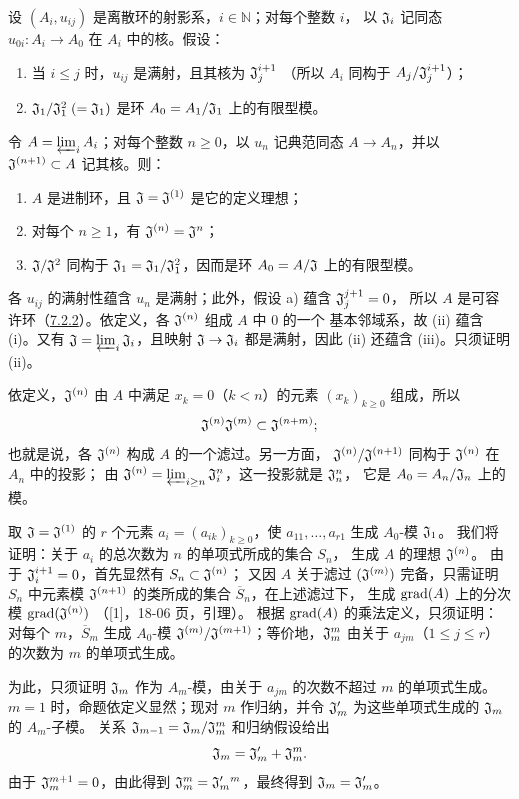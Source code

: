 设 $(A_i,u_{ij})$ 是离散环的射影系，$i\in\mathbb N$；对每个整数 $i$，
以 $\mathfrak J_i$ 记同态 $u_{0i}:A_i\to A_0$ 在 $A_i$ 中的核。假设：
\begin{enumerate}[label=\alph*)]
\item 当 $i\leq j$ 时，$u_{ij}$ 是满射，且其核为 $\mathfrak J_j^{i+1}$
（所以 $A_i$ 同构于 $A_j/\mathfrak J_j^{i+1}$）；
\item $\mathfrak J_1/\mathfrak J_1^2\;(=\mathfrak J_1)$ 是环 $A_0=A_1/\mathfrak J_1$ 上的有限型模。
\end{enumerate}
令 $A=\varprojlim_i A_i$；对每个整数 $n\geq0$，以 $u_n$ 记典范同态
$A\to A_n$，并以 $\mathfrak J^{(n+1)}\subset A$ 记其核。则：
\begin{enumerate}[label=(\roman*)]
\item $A$ 是进制环，且 $\mathfrak J=\mathfrak J^{(1)}$ 是它的定义理想；
\item 对每个 $n\geq1$，有 $\mathfrak J^{(n)}=\mathfrak J^n$；
\item $\mathfrak J/\mathfrak J^2$ 同构于 $\mathfrak J_1=\mathfrak J_1/\mathfrak J_1^2$，因而是环
$A_0=A/\mathfrak J$ 上的有限型模。
\end{enumerate}

各 $u_{ij}$ 的满射性蕴含 $u_n$ 是满射；此外，假设 a) 蕴含 $\mathfrak J_j^{j+1}=0$，
所以 $A$ 是可容许环（\hyperlink{para:0:7.2.2}{7.2.2}）。依定义，各 $\mathfrak J^{(n)}$ 组成 $A$ 中 $0$ 的一个
基本邻域系，故 (ii) 蕴含 (i)。又有 $\mathfrak J=\varprojlim_i\mathfrak J_i$，且映射
$\mathfrak J\to\mathfrak J_i$ 都是满射，因此 (ii) 还蕴含 (iii)。只须证明 (ii)。

依定义，$\mathfrak J^{(n)}$ 由 $A$ 中满足 $x_k=0$（$k<n$）的元素
$(x_k)_{k\geq0}$ 组成，所以
\[
 \mathfrak J^{(n)}\mathfrak J^{(m)}\subset\mathfrak J^{(n+m)};
\]
也就是说，各 $\mathfrak J^{(n)}$ 构成 $A$ 的一个滤过。另一方面，
$\mathfrak J^{(n)}/\mathfrak J^{(n+1)}$ 同构于 $\mathfrak J^{(n)}$ 在 $A_n$ 中的投影；
由 $\mathfrak J^{(n)}=\varprojlim_{i\geq n}\mathfrak J_i^n$，这一投影就是 $\mathfrak J_n^n$，
它是 $A_0=A_n/\mathfrak J_n$ 上的模。

取 $\mathfrak J=\mathfrak J^{(1)}$ 的 $r$ 个元素 $a_i=(a_{ik})_{k\geq0}$，使
$a_{11},\ldots,a_{r1}$ 生成 $A_0$-模 $\mathfrak J_1$。
我们将证明：关于 $a_i$ 的总次数为 $n$ 的单项式所成的集合 $S_n$，
生成 $A$ 的理想 $\mathfrak J^{(n)}$。
由于 $\mathfrak J_i^{i+1}=0$，首先显然有 $S_n\subset\mathfrak J^{(n)}$；
又因 $A$ 关于滤过 $(\mathfrak J^{(m)})$ 完备，只需证明 $S_n$ 中元素模
$\mathfrak J^{(n+1)}$ 的类所成的集合 $\overline S_n$，在上述滤过下，
生成 $\operatorname{grad}(A)$ 上的分次模 $\operatorname{grad}(\mathfrak J^{(n)})$
（[1]，18-06 页，引理）。
根据 $\operatorname{grad}(A)$ 的乘法定义，只须证明：对每个 $m$，$\overline S_m$
生成 $A_0$-模 $\mathfrak J^{(m)}/\mathfrak J^{(m+1)}$；等价地，$\mathfrak J_m^m$
由关于 $a_{jm}$（$1\leq j\leq r$）的次数为 $m$ 的单项式生成。

为此，只须证明 $\mathfrak J_m$ 作为 $A_m$-模，由关于 $a_{jm}$ 的次数不超过 $m$
的单项式生成。$m=1$ 时，命题依定义显然；现对 $m$ 作归纳，并令
$\mathfrak J'_m$ 为这些单项式生成的 $\mathfrak J_m$ 的 $A_m$-子模。
关系 $\mathfrak J_{m-1}=\mathfrak J_m/\mathfrak J_m^m$ 和归纳假设给出
\[
 \mathfrak J_m=\mathfrak J'_m+\mathfrak J_m^m.
\]
由于 $\mathfrak J_m^{m+1}=0$，由此得到 $\mathfrak J_m^m=\mathfrak J_m'{}^m$，最终得到
$\mathfrak J_m=\mathfrak J'_m$。

